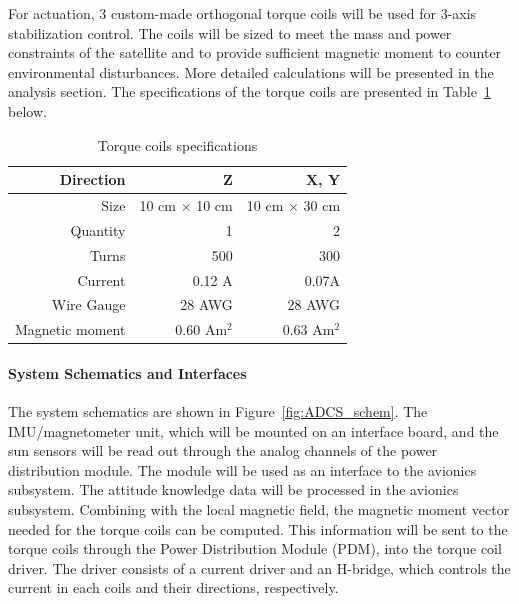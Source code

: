 \documentclass[12pt]{article}
\begin{document}
For actuation, 3 custom-made orthogonal torque coils will be used for 3-axis stabilization control. The coils will be sized to meet the mass and power constraints of the satellite and to provide sufficient magnetic moment to counter environmental disturbances. More detailed calculations will be presented in the analysis section. The specifications of the torque coils are presented in Table~\ref{tab:ADCS_torquecoils} below.
\begin{table}[htbp]
  \centering
  \caption{Torque coils specifications}
    \begin{tabular}{|r|r|r|}
    \hline
    Direction & Z     & X, Y \bigstrut\\
    \hline
    Size  & 10 cm $\times$ 10 cm  & 10 cm $\times$ 30 cm \bigstrut\\
    \hline
    Quantity & 1     & 2 \bigstrut\\
    \hline
    Turns & 500   & 300 \bigstrut\\
    \hline
    Current & 0.12 A & 0.07A \bigstrut\\
    \hline
    Wire Gauge & 28 AWG & 28 AWG \bigstrut\\
    \hline
    Magnetic moment & 0.60 Am$^2$ & 0.63 Am$^2$ \bigstrut\\
    \hline
    \end{tabular}%
  \label{tab:ADCS_torquecoils}%
\end{table}%
				\paragraph{System Schematics and Interfaces}
				The system schematics are shown in Figure~\ref{fig:ADCS_schem}. The IMU/magnetometer unit, which will be mounted on an interface board, and the sun sensors will be read out through the analog channels of the power distribution module. The module will be used as an interface to the avionics subsystem. The attitude knowledge data will be processed in the avionics subsystem. Combining with the local magnetic field, the magnetic moment vector needed for the torque coils can be computed. This information will be sent to the torque coils through the Power Distribution Module (PDM), into the torque coil driver. The driver consists of a current driver and an H-bridge, which controls the current in each coils and their directions, respectively. 
\end{document}
